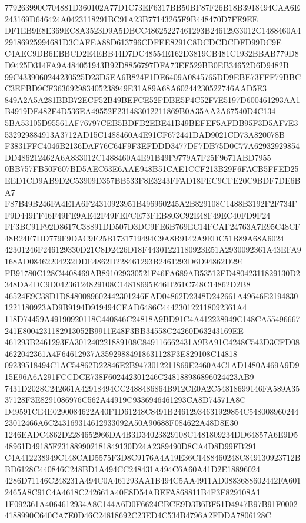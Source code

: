 \documentclass[UTF8,fontset=fandol,zihao=-4,a4paper]{ctexart}
\begin{document}
{{779263990C704881D360102A77D1C73EF6317BB50BF87F26B18B3918494CAA6E243169D646424A0423118291BC91A23B77143265F9B448470D7FE9EE
DF1EB9E8E369EC8A3523D9A5DBCC48625227461293B24612933012C1488460A429186925994681D3CAFEA88D613796CDFEE8291C8DCDCDCDFD99DC9E
C4AEC9DB6EBBCD2E4EBB44D7DC48554E162D3819CB481C1932BBAB779D8D9425D314FA9A484051943B92D8856797DFA73EF529BB0EB34652D6D9482B
99C4339060244230525D23D5EA6B824F1DE6409A0845765DD9EBE73FFF79BBCC3EFBD9CF363692983405238949E31A89A68A60244230522746AAD5E3
849A2A5A281BBB72ECF52B49BEFCE52FDBE5F4C52F7E5197D600461293AA1B4919DE482F4D536EA49552E231483012211869B0A35AA2A67540D4C134
5BA53105D95561AF76797CEB5BDFB2EBE41B49BEFEF5AFDB95F3D5AF7E3532929884913A3712AD15C1488460A4E91CF672441DAD9021CD73A820078B
F3831FFC4046B2136DAF76C64F9F3EFDDD3477DF7DB75D0C77A62932929854DD486212462A6A833012C1488460A4E91B49F9779A7F25F9671ABD7955
0BB757FB50F607BD5AEC63E6AAE948B51CAE1CCF213B29F6FACB5FFED25EED1CD9AB9D2C53909D357BB533F8E3243FFAD18FEC9CFE20C9BDF7DE6BA7
F87B49B246FA4E1A6F24310923951B496960245A2B829108C1488B3192F2F734FF9D449FF46F49FE9AE42F49FEFCE73FEB803C92E48F49EC40FD9F24
FF3BC91F92D8617C38891DD507D3DC9FE6B769EC14FCAF24763A7E95C48CF48B24F7DD779F9DAC9F25B1731719494C9A8B9142A9EDC51B89A68A6024
42301246F246129330D21C8D2426D18F44301221180923E51A2930092361A43EFA9168AD08462204232DDE4862D228461293B2461293D6D94862D294
FB91780C128C4408469AB891029330521F46FA689AB53512FD48042311829130D2348DA4DC9D04236124829108C14818695E46D261C748C14862D2B8
46524E9C38D1D8480089602442301246EAD04862D2348D242661A49646E21948301221180923AD9B9194D919494CEAD6486C444230122118092361A4
118D74459A49190920118C440846C24818A9BD91C4A412238949C148CA55496667241E8004231182913052B9911E48F3BB34558C24260D63243169EE
461293B2461293FA301240221889108C849116662431A9BA91C4248C543D3CFD084622042361A4F64612937A35929884918631128F3E829108C14818
09239518494C1AC54862D22846E2B9473012211869E2460A4C1AD1480A469A9D915E96A6A291FCCDCE738F602442301246C248188986896024423AB9
7431D2028C242661A42918494CC2488486864B912CE0A2C54818699146FA589A3537128F3E8291086976C562A44919C9336946461293CA8D74571A8C
D49591CE4E0290084622A40F1D61248C8491B24612934631929854C54800896024423012466A6C243169314612933092A50A90688F084622A48D8E30
1246EADC4862D2284652966DA4B3D34023829108C1481809234DD64857A6E9D548961D49185F231889902181849130D24A2389490D8CA4D8D99FB291
C4A412238949C148CAD5575F3D8C9176A4A19E36C1488460248C849130923712BBD6128C440846C248BD1A494CC248431A494C6A60A41D2E18896024
4286D71146C248231A494C0A461293AA1B494C5AA4911AD0883688602442FA6012465A8C91C4A4618C242661A40E8D54ABEFA868811B4F3F829108A1
1F092361A4064612934A8C144A6D0F6624CBCE9D3B6BF51D4947B97B91F00024188990C640CA7E0D46C24818692C23ED4C534B4796A2FDDA7806128C
}}
\end{document}
